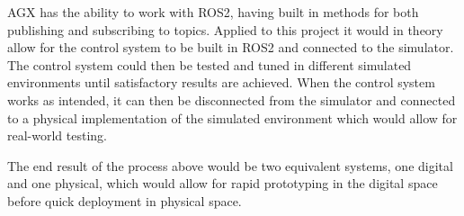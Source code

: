 AGX has the ability to work with ROS2, having built in methods for both publishing and subscribing to topics. Applied to this project it would in theory allow for the control system to be built in ROS2 and connected to the simulator. The control system could then be tested and tuned in different simulated environments until satisfactory results are achieved. When the control system works as intended, it can then be disconnected from the simulator and connected to a physical implementation of the simulated environment which would allow for real-world testing. 

The end result of the process above would be two equivalent systems, one digital and one physical, which would allow for rapid prototyping in the digital space before quick deployment in physical space. 


